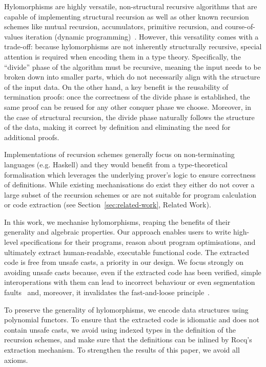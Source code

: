 \documentclass[a4paper,UKenglish,cleveref, autoref, thm-restate]{lipics-v2021}
\begin{document}
Hylomorphisms are highly versatile, non-structural recursive algorithms that are
capable of implementing structural recursion as well as other known recursion
schemes like mutual recursion, accumulators, primitive recursion, and
course-of-values iteration (dynamic programming)~\cite{HinzeWG15}. However, this
versatility comes with a trade-off: because hylomorphisms are not inherently
structurally recursive, special attention is required when encoding them in a
type theory. Specifically, the ``divide'' phase of the algorithm must be
recursive, meaning the input needs to be broken down into smaller parts, which
do not necessarily align with the structure of the input data. On the other
hand, a key benefit is the reusability of termination proofs: once the
correctness of the divide phase is established, the same proof can be reused for
any other conquer phase we choose. Moreover, in the case of structural
recursion, the divide phase naturally follows the structure of the data, making
it correct by definition and eliminating the need for additional proofs.

Implementations of recursion schemes generally focus on non-terminating
languages (e.g. Haskell) and they would benefit from a type-theoretical
formalisation which leverages the underlying prover's logic to ensure
correctness of definitions.  While existing mechanisations do exist they either
do not cover a large subset of the recursion schemes or are not suitable for
program calculation or code extraction (see Section~\ref{sec:related-work},
Related Work).

In this work, we mechanise hylomorphisms, reaping the benefits of their
generality and algebraic properties. Our approach enables users to write
high-level specifications for their programs, reason about program
optimisations, and ultimately extract human-readable, executable functional
code. The extracted code is free from unsafe casts, a priority in our design. We
focus strongly on avoiding unsafe casts because, even if the extracted code has
been verified, simple interoperations with them can lead to incorrect behaviour
or even segmentation faults~\cite{forster:hal-04329663} and, moreover, it
invalidates the fast-and-loose principle~\cite{DanielssonHJG06}.

To preserve the generality of hylomorphisms, we encode data structures using
polynomial functors. To ensure that the extracted code is idiomatic and does not
contain unsafe casts, we avoid using indexed types in the definition of the
recursion schemes, and make sure that the definitions can be inlined by Rocq's
extraction mechanism. To strengthen the results of this paper, we avoid all
axioms.
\end{document}
